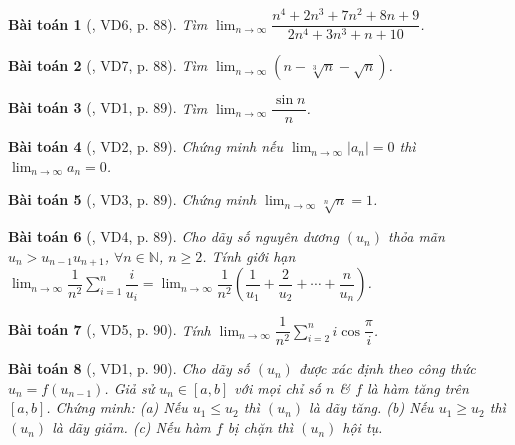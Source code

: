 \documentclass[oneside]{book}
\newtheorem{baitoan}{Bài toán}
\begin{document}
\begin{baitoan}[\cite{Hung_nang_cao_phat_trien_Toan_11_tap_1}, VD6, p. 88]
	Tìm $\lim_{n\to\infty} \dfrac{n^4 + 2n^3 + 7n^2 + 8n + 9}{2n^4 + 3n^3 + n + 10}$.
\end{baitoan}

\begin{baitoan}[\cite{Hung_nang_cao_phat_trien_Toan_11_tap_1}, VD7, p. 88]
	Tìm $\lim_{n\to\infty} (n - \sqrt[3]{n} - \sqrt{n})$.
\end{baitoan}

\begin{baitoan}[\cite{Hung_nang_cao_phat_trien_Toan_11_tap_1}, VD1, p. 89]
	Tìm $\lim_{n\to\infty} \dfrac{\sin n}{n}$.
\end{baitoan}

\begin{baitoan}[\cite{Hung_nang_cao_phat_trien_Toan_11_tap_1}, VD2, p. 89]
	Chứng minh nếu $\lim_{n\to\infty} |a_n| = 0$ thì $\lim_{n\to\infty} a_n = 0$.
\end{baitoan}

\begin{baitoan}[\cite{Hung_nang_cao_phat_trien_Toan_11_tap_1}, VD3, p. 89]
	Chứng minh $\lim_{n\to\infty} \sqrt[n]{n} = 1$.
\end{baitoan}

\begin{baitoan}[\cite{Hung_nang_cao_phat_trien_Toan_11_tap_1}, VD4, p. 89]
	Cho dãy số nguyên dương $(u_n)$ thỏa mãn $u_n > u_{n-1}u_{n+1}$, $\forall n\in\mathbb{N}$, $n\ge2$. Tính giới hạn $\lim_{n\to\infty} \dfrac{1}{n^2}\sum_{i=1}^n \dfrac{i}{u_i} = \lim_{n\to\infty} \dfrac{1}{n^2}\left(\dfrac{1}{u_1} + \dfrac{2}{u_2} + \cdots + \dfrac{n}{u_n}\right)$.
\end{baitoan}

\begin{baitoan}[\cite{Hung_nang_cao_phat_trien_Toan_11_tap_1}, VD5, p. 90]
	Tính $\lim_{n\to\infty} \dfrac{1}{n^2}\sum_{i=2}^n i\cos\dfrac{\pi}{i}$.
\end{baitoan}

\begin{baitoan}[\cite{Hung_nang_cao_phat_trien_Toan_11_tap_1}, VD1, p. 90]
	Cho dãy số $(u_n)$ được xác định theo công thức $u_n = f(u_{n-1})$. Giả sử $u_n\in[a,b]$ với mọi chỉ số $n$ \& $f$ là hàm tăng trên $[a,b]$. Chứng minh: (a) Nếu $u_1\le u_2$ thì $(u_n)$ là dãy tăng. (b) Nếu $u_1\ge u_2$ thì $(u_n)$ là dãy giảm. (c) Nếu hàm $f$ bị chặn thì $(u_n)$ hội tụ.
\end{baitoan}
\end{document}
